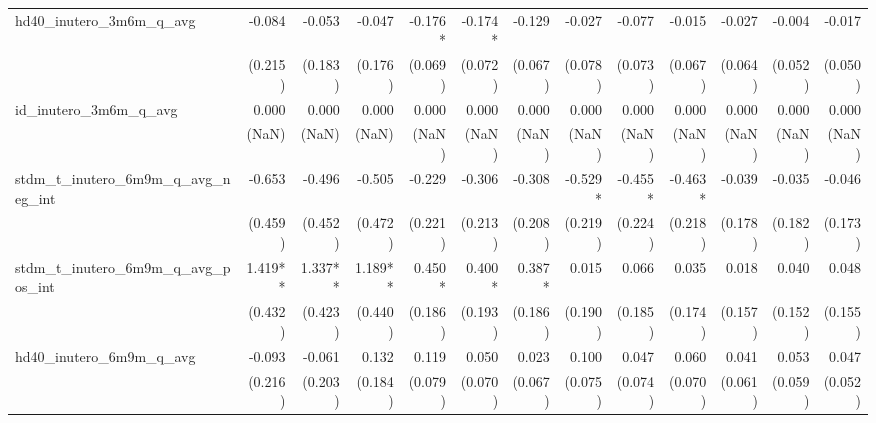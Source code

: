 \begin{tabular}{lrrrrrrrrrrrr}
hd40\_inutero\_3m6m\_q\_avg                 &       -0.084 &       -0.053 &       -0.047 &      -0.176* &      -0.174* &       -0.129 &       -0.027 &       -0.077 &       -0.015 &       -0.027 &       -0.004 &       -0.017 \\ 
                                            &      (0.215) &      (0.183) &      (0.176) &      (0.069) &      (0.072) &      (0.067) &      (0.078) &      (0.073) &      (0.067) &      (0.064) &      (0.052) &      (0.050) \\ 
id\_inutero\_3m6m\_q\_avg                   &        0.000 &        0.000 &        0.000 &        0.000 &        0.000 &        0.000 &        0.000 &        0.000 &        0.000 &        0.000 &        0.000 &        0.000 \\ 
                                            &        (NaN) &        (NaN) &        (NaN) &        (NaN) &        (NaN) &        (NaN) &        (NaN) &        (NaN) &        (NaN) &        (NaN) &        (NaN) &        (NaN) \\ 
stdm\_t\_inutero\_6m9m\_q\_avg\_neg\_int    &       -0.653 &       -0.496 &       -0.505 &       -0.229 &       -0.306 &       -0.308 &      -0.529* &      -0.455* &      -0.463* &       -0.039 &       -0.035 &       -0.046 \\ 
                                            &      (0.459) &      (0.452) &      (0.472) &      (0.221) &      (0.213) &      (0.208) &      (0.219) &      (0.224) &      (0.218) &      (0.178) &      (0.182) &      (0.173) \\ 
stdm\_t\_inutero\_6m9m\_q\_avg\_pos\_int    &      1.419** &      1.337** &      1.189** &       0.450* &       0.400* &       0.387* &        0.015 &        0.066 &        0.035 &        0.018 &        0.040 &        0.048 \\ 
                                            &      (0.432) &      (0.423) &      (0.440) &      (0.186) &      (0.193) &      (0.186) &      (0.190) &      (0.185) &      (0.174) &      (0.157) &      (0.152) &      (0.155) \\ 
hd40\_inutero\_6m9m\_q\_avg                 &       -0.093 &       -0.061 &        0.132 &        0.119 &        0.050 &        0.023 &        0.100 &        0.047 &        0.060 &        0.041 &        0.053 &        0.047 \\ 
                                            &      (0.216) &      (0.203) &      (0.184) &      (0.079) &      (0.070) &      (0.067) &      (0.075) &      (0.074) &      (0.070) &      (0.061) &      (0.059) &      (0.052) \\ 

\end{tabular}
